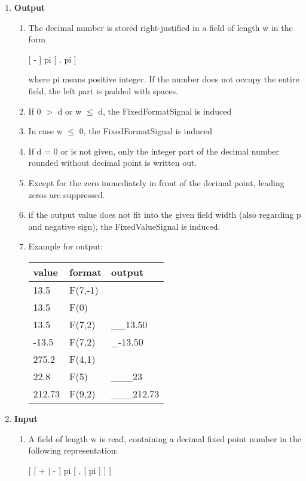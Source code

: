 \begin{enumerate}
\item {\bf Output}
\begin{enumerate}
\item The decimal number is stored right-justified in a field of length
w in the form

[ - ] pi [ . pi ]

where pi means positive integer. If the number does not occupy the
entire field, the left part is padded with spaces.
\item If 0 $>$ d or w $\leq$ d, the FixedFormatSignal is induced
\item In case w $\leq$ 0, the FixedFormatSignal is induced
\item If d = 0 or is not given, only the integer part of the decimal
number rounded without decimal point is written out.
\item Except for the zero immediately in front of the decimal point,
leading zeros are suppressed.
\item if the output value does not fit into the given field width 
   (also regarding p and negative sign), the FixedValueSignal is induced.
\item Example for output:

\begin{tabular}{lll}
value  & format   & output \\ \hline
13.5   & F(7,-1)   &  \x \x {\em FixedFormatSignal!}  \\
13.5   & F(0)   &  \x \x {\em FixedFormatSignal!}  \\
13.5   & F(7,2)   & \_\_13.50  \\
-13.5   & F(7,2)   & \_-13.50  \\
275.2  & F(4,1)   &  \x \x {\em FixedValueSignal!} \\
22.8   & F(5)     & \_\_\_23 \\
212.73 & F(9,2)   & \_\_\_212.73 \\
\end{tabular}
\end{enumerate}
\item {\bf Input}
\begin{enumerate}
\item A field of length w is read, containing a decimal fixed point
number in the following representation:

[ [ + $\mid$ - ] pi [ . [ pi ] ] ]


\end{enumerate}
\end{enumerate}
